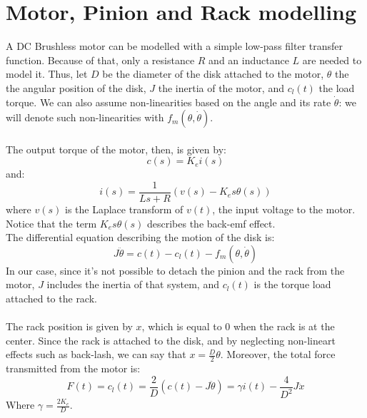\section{Motor, Pinion and Rack modelling} 
A DC Brushless motor can be modelled with a simple low-pass filter transfer function. Because of that, only a resistance $R$ and an inductance $L$ are needed to model it. Thus, let $D$ be the diameter of the disk attached to the motor, $\theta$ the the angular position of the disk, $J$ the inertia of the motor, and $c_{l}(t)$ the load torque. We can also assume non-linearities based on the angle and its rate $\dot{\theta}$:  we will denote such non-linearities with $f_{m}(\theta,\dot{\theta})$.\\ \\
 The output torque of the motor, then, is  given by:
 \begin{equation}
 c(s) = K_e i(s)
 \end{equation}
and:
\begin{equation}
i(s)=\frac{1}{Ls+R} (v(s)-K_{e}s \theta(s))
\end{equation}
where $v(s)$ is the Laplace transform of $v(t)$, the input voltage to the motor. Notice that the term $K_{e}s \theta(s)$ describes the back-emf effect. \\
The differential equation describing the motion of the disk is:
$$J\ddot{\theta}=c(t)-c_{l}(t) -f_{m}(\theta,\dot{\theta})$$
In our case, since it's not possible to detach the pinion and the rack from the motor, $J$ includes the inertia of that system, and $c_{l}(t)$ is the torque load attached to the rack. 
\\ \\
The rack position is given by $x$, which is equal to $0$ when the rack is at the center. Since the rack is attached to the disk, and by neglecting non-lineart effects such as back-lash, we can say that $x=\frac{D}{2}\theta $. Moreover,  the total force transmitted from the motor is:
$$F(t) =c_l (t) =  \frac{2}{D} (c(t)-J\ddot{\theta}) = \gamma i(t) - \frac{4}{D^2}J \ddot{x}$$
Where $\gamma = \frac{2K_e}{D}$.

